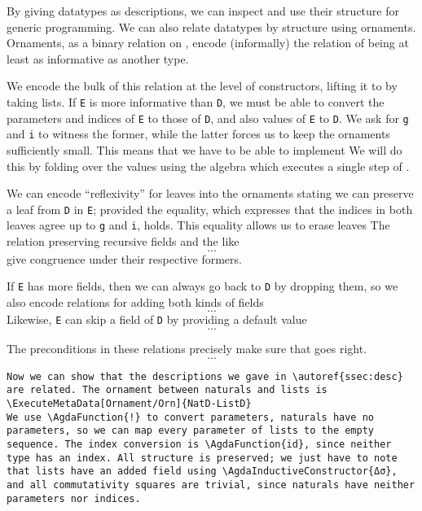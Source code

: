 By giving datatypes as descriptions, we can inspect and use their structure for generic programming. We can also relate datatypes by structure using ornaments. Ornaments, as a binary relation on , encode (informally) the relation of being at least as informative as another type.

We encode the bulk of this relation at the level of constructors, lifting it to  by taking lists.
If \texttt{E} is more informative than \texttt{D}, we must be able to convert the parameters and indices of \texttt{E} to those of \texttt{D}, and also values of \texttt{E} to \texttt{D}. We ask for \texttt{g} and \texttt{i} to witness the former, while the latter forces us to keep the ornaments sufficiently small. This means that we have to be able to implement
We will do this by folding over the values using the algebra
which executes a single step of .

We can encode ``reflexivity'' for leaves into the ornaments
stating we can preserve a leaf from \texttt{D} in \texttt{E}; provided the equality, which expresses that the indices in both leaves agree up to \texttt{g} and \texttt{i}, holds. This equality allows us to erase leaves
The relation preserving recursive fields and the like
\[ ... \] 
give congruence under their respective formers.

If \texttt{E} has more fields, then we can always go back to \texttt{D} by dropping them, so we also encode relations for adding both kinds of fields
\[ ... \]
Likewise, \texttt{E} can skip a field of \texttt{D} by providing a default value
\[ ... \]

The preconditions in these relations precisely make sure that  goes right.
\[ ... \]

\begin{verbatim}
Now we can show that the descriptions we gave in \autoref{ssec:desc} are related. The ornament between naturals and lists is
\ExecuteMetaData[Ornament/Orn]{NatD-ListD}
We use \AgdaFunction{!} to convert parameters, naturals have no parameters, so we can map every parameter of lists to the empty sequence. The index conversion is \AgdaFunction{id}, since neither type has an index. All structure is preserved; we just have to note that lists have an added field using \AgdaInductiveConstructor{Δσ}, and all commutativity squares are trivial, since naturals have neither parameters nor indices.
\end{verbatim}